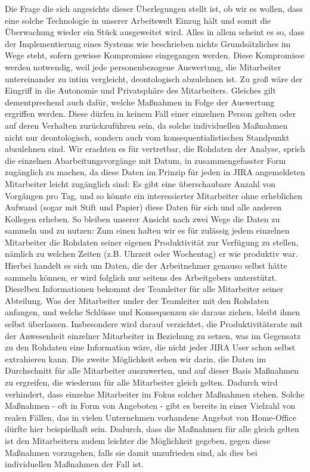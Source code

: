 \documentclass[a4paper,12pt,]{article}
\begin{document}
Die Frage die sich angesichts dieser Überlegungen stellt ist, ob wir es wollen, dass eine solche Technologie in unserer Arbeitswelt Einzug hält und somit die Überwachung wieder ein Stück ausgeweitet wird. Alles in allem scheint es so, dass der Implementierung eines Systems wie beschrieben nichts Grundsätzliches im Wege steht, sofern gewisse Kompromisse eingegangen werden. Diese Kompromisse werden notwendig, weil jede personenbezogene Auswertung, die Mitarbeiter untereinander zu intim vergleicht, deontologisch abzulehnen ist. Zu groß wäre der Eingriff in die Autonomie und Privatsphäre des Mitarbeiters. Gleiches gilt dementprechend auch dafür, welche Maßnahmen in Folge der Auswertung ergriffen werden. Diese dürfen in keinem Fall einer einzelnen Person gelten oder auf deren Verhalten zurückzuführen sein, da solche individuellen Maßnahmen nicht nur deontologisch, sondern auch vom konsequentialistischen Standpunkt abzulehnen sind. Wir erachten es für vertretbar, die Rohdaten der Analyse, sprich die einzelnen Abarbeitungsvorgänge mit Datum, in zusammengefasster Form zugänglich zu machen, da diese Daten im Prinzip für jeden in JIRA angemeldeten Mitarbeiter leicht zugänglich sind: Es gibt eine überschaubare Anzahl von Vorgängen pro Tag, und so könnte ein interessierter Mitarbeiter ohne erheblichen Aufwand (sogar mit Stift und Papier) diese Daten für sich und alle anderen Kollegen erheben. So bleiben unserer Ansicht nach zwei Wege die Daten zu sammeln und zu nutzen: Zum einen halten wir es für zulässig jedem einzelnen Mitarbeiter die Rohdaten seiner eigenen Produktivität zur Verfügung zu stellen, nämlich zu welchen Zeiten (z.B. Uhrzeit oder Wochentag) er wie produktiv war. Hierbei handelt es sich um Daten, die der Arbeitnehmer genauso selbst hätte sammeln können, er wird folglich nur seitens des Arbeitgebers unterstützt. Dieselben Informationen bekommt der Teamleiter für alle Mitarbeiter seiner Abteilung. Was der Mitarbeiter under der Teamleiter mit den Rohdaten anfangen, und welche Schlüsse und Konsequenzen sie daraus ziehen, bleibt ihnen selbst überlassen. Insbesondere wird darauf verzichtet, die Produktivitätsrate mit der Anwesenheit einzelner Mitarbeiter in Beziehung zu setzen, was im Gegensatz zu den Rohdaten eine Information wäre, die nicht jeder JIRA User schon selbst extrahieren kann. Die zweite Möglichkeit sehen wir darin, die Daten im Durchschnitt für alle Mitarbeiter auszuwerten, und auf dieser Basis Maßnahmen zu ergreifen, die wiederum für alle Mitarbeiter gleich gelten. Dadurch wird verhindert, dass einzelne Mitarbeiter im Fokus solcher Maßnahmen stehen. Solche Maßnahmen - oft in Form von Angeboten - gibt es bereits in einer Vielzahl von realen Fällen, das in vielen Unternehmen vorhandene Angebot von Home-Office dürfte hier beispielhaft sein. Dadurch, dass die Maßnahmen für alle gleich gelten ist den Mitarbeitern zudem leichter die Möglichkeit gegeben, gegen diese Maßnahmen vorzugehen, falls sie damit unzufrieden sind, als dies bei individuellen Maßnahmen der Fall ist.
\end{document}
